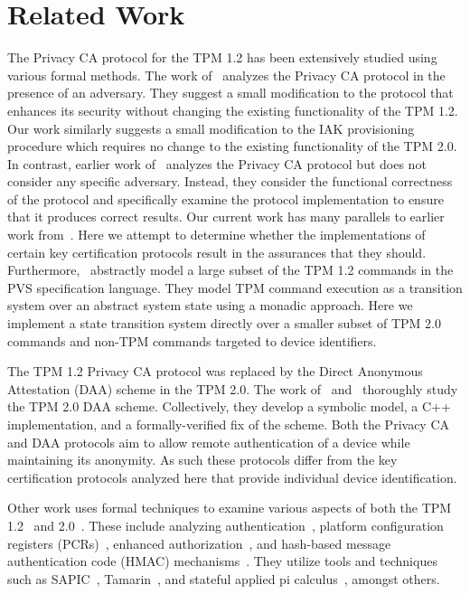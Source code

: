 \documentclass[runningheads]{llncs}
\begin{document}
\section{Related Work}
The Privacy CA protocol for the TPM 1.2 has been extensively studied
using various formal methods.  The work
of~\citet{PrivacyCAAnalysis-Chen} analyzes the Privacy CA protocol in
the presence of an adversary. They suggest a small modification to the
protocol that enhances its security without changing the existing
functionality of the TPM 1.2. Our work similarly suggests a small
modification to the IAK provisioning procedure which requires no
change to the existing functionality of the TPM 2.0.  In contrast,
earlier work of~\citet{PrivacyCAAnalysis-Hall,TPM12Model} analyzes the
Privacy CA protocol but does not consider any specific
adversary. Instead, they consider the functional correctness of the
protocol and specifically examine the protocol implementation to
ensure that it produces correct results.  Our current work has many
parallels to earlier work from~\citeauthor{PrivacyCAAnalysis-Hall}.
Here we attempt to determine whether the implementations of certain
key certification protocols result in the assurances that they should.
Furthermore,~\citeauthor{PrivacyCAAnalysis-Hall} abstractly model a
large subset of the TPM 1.2 commands in the PVS specification
language. They model TPM command execution as a transition system over
an abstract system state using a monadic approach. Here we implement a
state transition system directly over a smaller subset of TPM 2.0
commands and non-TPM commands targeted to device identifiers.

The TPM 1.2 Privacy CA protocol was replaced by the Direct Anonymous Attestation
(DAA) scheme in the TPM 2.0.  The work of~\citet{DAAAnalysis-Whit}
and~\citet{DAAAnalysis-Wes} thoroughly study the TPM 2.0 DAA scheme.
Collectively, they develop a symbolic model, a C++ implementation, and a
formally-verified fix of the scheme. Both the Privacy CA and DAA protocols aim
to allow remote authentication of a device while maintaining its anonymity. As
such these protocols differ from the key certification protocols analyzed here
that provide individual device identification.

Other work uses formal techniques to examine various aspects of both the TPM
1.2~\citep{AuthAnalysis,PCRAnalysis} and 2.0~\citep{EAAnalysis,HMACAnalysis}.
These include analyzing authentication~\citep{AuthAnalysis}, platform
configuration registers (PCRs)~\citep{PCRAnalysis}, enhanced
authorization~\citep{EAAnalysis}, and hash-based message authentication code
(HMAC) mechanisms~\citep{HMACAnalysis}. They utilize tools and techniques such
as SAPIC~\citep{kremer2016automated}, Tamarin~\citep{meier2013tamarin}, and
stateful applied pi calculus~\citep{Milner:99:Communicating-a}, amongst others.
%
%
%
\end{document}
